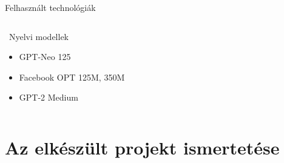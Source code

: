 \documentclass[11pt]{beamer}
\begin{document}
\begin{frame}{Felhasznált technológiák}
\begin{columns}[T]
\begin{block}{\faRobot~Nyelvi modellek}
\begin{itemize}
          \item GPT-Neo 125
          \item Facebook OPT 125M, 350M
          \item GPT-2 Medium
        \end{itemize}
      \end{block}
    \end{columns}
\end{frame}

\section{Az elkészült projekt ismertetése}
\end{document}
